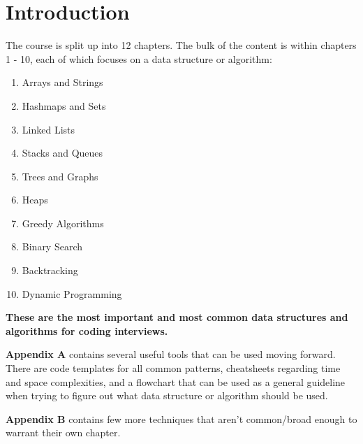 \chapter{Introduction}
\label{introduction}

The course is split up into 12 chapters. The bulk of the content is within chapters 1 - 10, each of which focuses on a data structure or algorithm:

\begin{enumerate}
	\item{} Arrays and Strings
	\item{} Hashmaps and Sets
	\item{} Linked Lists
	\item{} Stacks and Queues
	\item{} Trees and Graphs
	\item{} Heaps
	\item{} Greedy Algorithms
	\item{} Binary Search
	\item{} Backtracking
	\item{} Dynamic Programming
\end{enumerate}

\textbf{These are the most important and most common data structures and algorithms for coding interviews.}

\textbf{Appendix A} contains several useful tools that can be used moving forward. There are code templates for all common patterns, cheatsheets regarding time and space complexities, and a flowchart that can be used as a general guideline when trying to figure out what data structure or algorithm should be used.

\textbf{Appendix B} contains few more techniques that aren't common/broad enough to warrant their own chapter.
